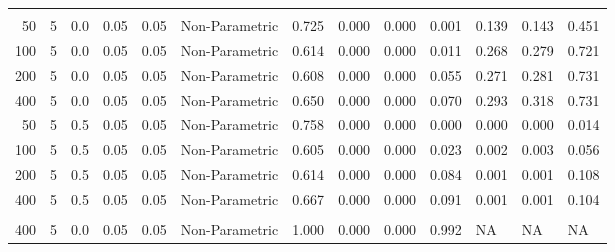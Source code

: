 \begin{table}
{{\begin{tabular}{rrrrrllllllll}
\addlinespace[0.3em]
\multicolumn{13}{l}{\textbf{$t_3$ Distribution}}\\
\hspace{1em}50 & 5 & 0.0 & 0.05 & 0.05 & Non-Parametric & 0.725 & 0.000 & 0.000 & 0.001 & 0.139 & 0.143 & 0.451\\
\hspace{1em}100 & 5 & 0.0 & 0.05 & 0.05 & Non-Parametric & 0.614 & 0.000 & 0.000 & 0.011 & 0.268 & 0.279 & 0.721\\
\hspace{1em}200 & 5 & 0.0 & 0.05 & 0.05 & Non-Parametric & 0.608 & 0.000 & 0.000 & 0.055 & 0.271 & 0.281 & 0.731\\
\hspace{1em}400 & 5 & 0.0 & 0.05 & 0.05 & Non-Parametric & 0.650 & 0.000 & 0.000 & 0.070 & 0.293 & 0.318 & 0.731\\
\hspace{1em}50 & 5 & 0.5 & 0.05 & 0.05 & Non-Parametric & 0.758 & 0.000 & 0.000 & 0.000 & 0.000 & 0.000 & 0.014\\
\hspace{1em}100 & 5 & 0.5 & 0.05 & 0.05 & Non-Parametric & 0.605 & 0.000 & 0.000 & 0.023 & 0.002 & 0.003 & 0.056\\
\hspace{1em}200 & 5 & 0.5 & 0.05 & 0.05 & Non-Parametric & 0.614 & 0.000 & 0.000 & 0.084 & 0.001 & 0.001 & 0.108\\
\hspace{1em}400 & 5 & 0.5 & 0.05 & 0.05 & Non-Parametric & 0.667 & 0.000 & 0.000 & 0.091 & 0.001 & 0.001 & 0.104\\
\addlinespace[0.3em]
\multicolumn{13}{l}{\textbf{Log-normal Distribution}}\\
\hspace{1em}400 & 5 & 0.0 & 0.05 & 0.05 & Non-Parametric & 1.000 & 0.000 & 0.000 & 0.992 & NA & NA & NA\\
\bottomrule
\end{tabular}
}}
 \end{table}